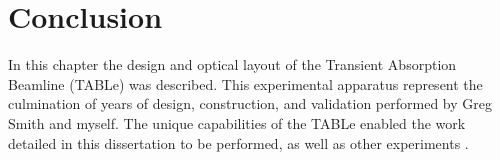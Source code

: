 \section{Conclusion}

In this chapter the design and optical layout of the Transient Absorption Beamline (TABLe) was described.  This experimental apparatus represent the culmination of years of design, construction, and validation performed by Greg Smith and myself.  The unique capabilities of the TABLe enabled the work detailed in this dissertation to be performed, as well as other experiments \cite{kiesewetterDynamicsNearThresholdAttosecond2019, camperHighRelativephasePrecision2019, leshchenkoHighpowerFewcycleCr2020}.










